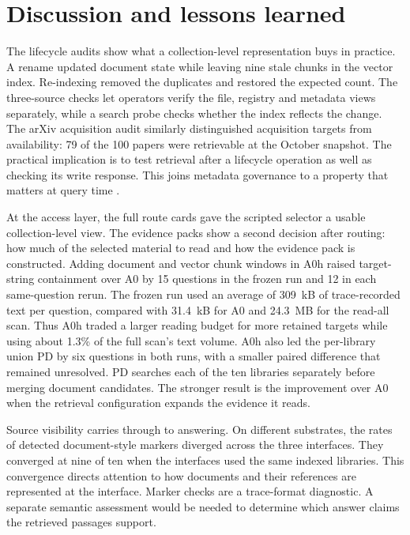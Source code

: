 \section{Discussion and lessons learned}
\label{sec:discussion}

The lifecycle audits show what a collection-level representation buys in
practice. A rename updated document state while leaving nine stale chunks
in the vector index. Re-indexing removed the duplicates and restored the
expected count. The three-source checks let operators verify the file,
registry and metadata views separately, while a search probe checks whether
the index reflects the change. The arXiv acquisition audit similarly
distinguished acquisition targets from availability: 79 of the 100 papers
were retrievable at the October snapshot. The practical implication is to
test retrieval after a lifecycle operation as well as checking its write
response. This joins metadata governance to a property that matters at
query time \citep{park-metadata-quality-2009,paivarinta-ecm-2005}.

At the access layer, the full route cards gave the scripted selector a
usable collection-level view. The evidence packs show a second decision
after routing: how much of the selected material to read and how the
evidence pack is constructed. Adding document
and vector chunk windows in A0h raised target-string containment over A0 by
15 questions in the frozen run and 12 in each same-question rerun. The
frozen run used an average of 309~kB of trace-recorded text per question,
compared with 31.4~kB for A0 and 24.3~MB for the read-all scan. Thus
A0h traded a larger reading budget for more retained targets while using
about 1.3\% of the full scan's text volume. A0h also led the per-library
union PD by six questions in both runs, with a smaller paired difference
that remained unresolved. PD searches each of the ten libraries separately
before merging document candidates. The stronger result is the improvement over A0
when the retrieval configuration expands the evidence it reads.

Source visibility carries through to answering. On different substrates,
the rates of detected document-style markers diverged across the three
interfaces. They converged at nine of ten when the interfaces used the same
indexed libraries. This convergence directs attention to how documents and
their references are represented at the interface. Marker checks are a
trace-format diagnostic. A separate semantic assessment would be needed to
determine which answer claims the retrieved passages support.

